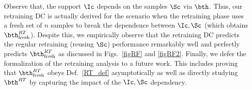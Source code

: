Observe that, the support $\Ic$ depends on the samples $\Sc$ via $\bth$. Thus, our retraining DC is actually derived for the scenario when the retraining phase uses a fresh set of $n$ samples to break the dependence between $\Ic,\Sc$ (which obtains $\bth^{RT}_{\text{fresh}}$). Despite this, we empirically observe that the retraining DC predicts the regular retraining (reusing $\Sc$) performance remarkably well and perfectly predicts $\bth^{RT}_{\text{fresh}}$ as discussed in Figs.~\ref{figRF} and \ref{figRF2}. Finally, we defer the formalization of the retraining analysis to a future work. This includes proving that $\bth^{RT}_{\text{fresh}}$ obeys Def.~\ref{RT_def} asymptotically as well as directly studying $\bth^{RT}$ by capturing the impact of the $\Ic,\Sc$ dependency.
 











